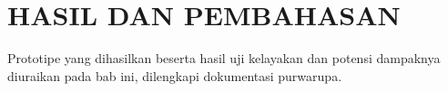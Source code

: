 \chapter{HASIL DAN PEMBAHASAN}
Prototipe yang dihasilkan beserta hasil uji kelayakan dan potensi dampaknya diuraikan pada bab
ini, dilengkapi dokumentasi purwarupa.

